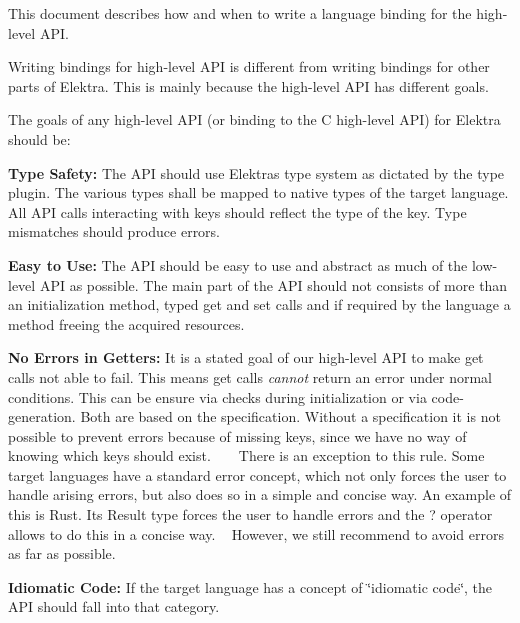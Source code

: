 This document describes how and when to write a language binding for the high-\/level A\+PI.

Writing bindings for high-\/level A\+PI is different from writing bindings for other parts of Elektra. This is mainly because the high-\/level A\+PI has different goals.

The goals of any high-\/level A\+PI (or binding to the C high-\/level A\+PI) for Elektra should be\+:


\begin{DoxyItemize}
\item {\bfseries{Type Safety\+:}} The A\+PI should use Elektra\textquotesingle{}s type system as dictated by the {\ttfamily type} plugin. The various types shall be mapped to native types of the target language. All A\+PI calls interacting with keys should reflect the type of the key. Type mismatches should produce errors.
\item {\bfseries{Easy to Use\+:}} The A\+PI should be easy to use and abstract as much of the low-\/level A\+PI as possible. The main part of the A\+PI should not consists of more than an initialization method, typed {\ttfamily get} and {\ttfamily set} calls and if required by the language a method freeing the acquired resources.
\item {\bfseries{No Errors in Getters\+:}} It is a stated goal of our high-\/level A\+PI to make {\ttfamily get} calls not able to fail. This means {\ttfamily get} calls {\itshape cannot} return an error under normal conditions. This can be ensure via checks during initialization or via code-\/generation. Both are based on the specification. Without a specification it is not possible to prevent errors because of missing keys, since we have no way of knowing which keys should exist. ~\newline
~\newline
 There is an exception to this rule. Some target languages have a standard error concept, which not only forces the user to handle arising errors, but also does so in a simple and concise way. An example of this is Rust. Its {\ttfamily Result} type forces the user to handle errors and the {\ttfamily ?} operator allows to do this in a concise way. ~\newline
 However, we still recommend to avoid errors as far as possible.
\item {\bfseries{Idiomatic Code\+:}} If the target language has a concept of \char`\"{}idiomatic code\char`\"{}, the A\+PI should fall into that category.
\end{DoxyItemize}

